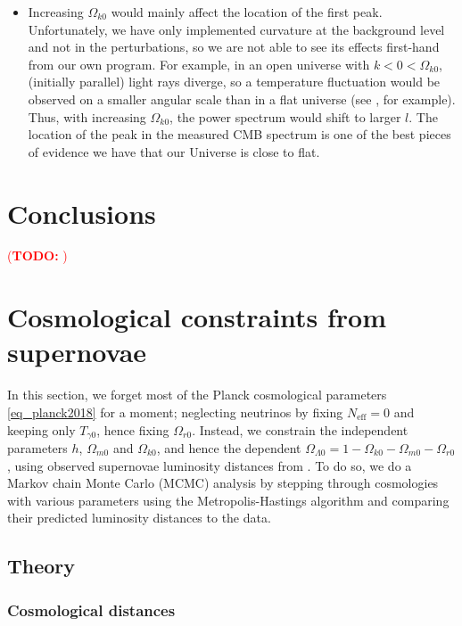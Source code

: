 \documentclass[10pt,a4paper]{article}
\newcommand\TODO[1]{\textcolor{red}{(\textbf{TODO:} #1)}}
\begin{document}
\begin{itemize}
\item
Increasing $\Omega_{k0}$ would mainly affect the location of the first peak.
Unfortunately, we have only implemented curvature at the background level and not in the perturbations,
so we are not able to see its effects first-hand from our own program.
For example, in an open universe with $k < 0 < \Omega_{k0}$,
(initially parallel) light rays diverge,
so a temperature fluctuation would be observed on a smaller angular scale
than in a flat universe (see \cite[figure 9.14]{dodelsonModernCosmology2021}, for example).
Thus, with increasing $\Omega_{k0}$,
the power spectrum would shift to larger $l$.
The location of the peak in the measured CMB spectrum
is one of the best pieces of evidence we have
that our Universe is close to flat.
\end{itemize}

\clearpage
\section{Conclusions}

\TODO{}

\clearpage
\appendix
\section{Cosmological constraints from supernovae}
\label{sec_supernova}

In this section, we forget most of the Planck cosmological parameters \eqref{eq_planck2018} for a moment;
neglecting neutrinos by fixing $N_\text{eff}=0$ and keeping only $T_{\gamma0}$, hence fixing $\Omega_{r0}$.
Instead, we constrain the independent parameters $h$, $\Omega_{m0}$ and $\Omega_{k0}$,
and hence the dependent $\Omega_{\Lambda 0}=1-\Omega_{k0}-\Omega_{m0}-\Omega_{r0}$,
using observed supernovae luminosity distances from \cite{betouleImprovedCosmologicalConstraints2014}.
To do so, we do a Markov chain Monte Carlo (MCMC) analysis
by stepping through cosmologies with various parameters using the Metropolis-Hastings algorithm
and comparing their predicted luminosity distances to the data.

\subsection{Theory}

\subsubsection*{Cosmological distances}
\end{document}
